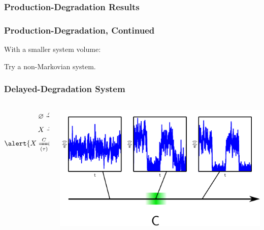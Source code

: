 \documentclass[xcolor={usenames,dvipsnames,svgnames},url=hyphens]{beamer}
\begin{document}
\begin{frame}
    \frametitle{Production-Degradation Results}
    \begin{center}
        \resizebox{0.48\textwidth}{!}{
            
        }
        \resizebox{0.48\textwidth}{!}{
            
        }
    \end{center}
\end{frame}

\begin{frame}
    \frametitle{Production-Degradation, Continued}
    With a smaller system volume:

    \begin{center}
        \resizebox{0.48\textwidth}{!}{
            
        }
        \resizebox{0.48\textwidth}{!}{
            
        }
    \end{center}

    \pause
    Try a non-Markovian system.
\end{frame}

\begin{frame}
    \frametitle{Delayed-Degradation System}
    \begin{columns}[c]
        \begin{column}{2cm}
            \begin{align*}
                \varnothing \xrightarrow{A} X \\
                X \xrightarrow{B} \varnothing \\
                \alert{X \xRightarrow[(\tau)]{C} \varnothing}
            \end{align*}
        \end{column}
        \begin{column}{9cm}
            \includegraphics{figures/dd-behavior.pdf}
        \end{column}
    \end{columns}
\end{frame}
\end{document}
